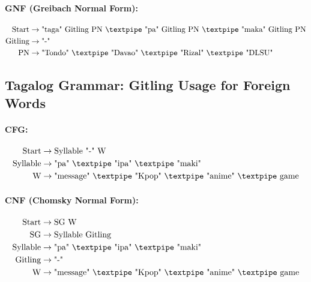 \paragraph{GNF (Greibach Normal Form):}

\begin{equation*}
    \begin{aligned}
        \text{Start}   & \rightarrow \text{"taga" Gitling PN {\textpipe} "pa" Gitling PN {\textpipe} "maka" Gitling PN}\\
        \text{Gitling} & \rightarrow \text{"-"}\\
        \text{PN} & \rightarrow \text{"Tondo" {\textpipe} "Davao" {\textpipe} "Rizal" {\textpipe} "DLSU"}   \\
    \end{aligned}
\end{equation*}

\subsection{Tagalog Grammar: Gitling Usage for Foreign Words}

\paragraph{CFG:}

\begin{equation*}
    \begin{aligned}
        \text{Start}  & \rightarrow \text{Syllable "-" W}   \\
        \text{Syllable}    & \rightarrow \text{"pa" {\textpipe} "ipa" {\textpipe} "maki"}\\        
        \text{W} & \rightarrow \text{"message" {\textpipe} "Kpop" {\textpipe} "anime" {\textpipe} game}\\
    \end{aligned}
\end{equation*}

\paragraph{CNF (Chomsky Normal Form):}

\begin{equation*}
    \begin{aligned}
        \text{Start}   & \rightarrow \text{SG W} \\
        \text{SG}      & \rightarrow \text{Syllable Gitling}\\
        \text{Syllable}    & \rightarrow \text{"pa" {\textpipe} "ipa" {\textpipe} "maki"}\\        
        \text{Gitling} & \rightarrow \text{"-"}\\
        \text{W} & \rightarrow \text{"message" {\textpipe} "Kpop" {\textpipe} "anime" {\textpipe} game}\\
    \end{aligned}
\end{equation*}

